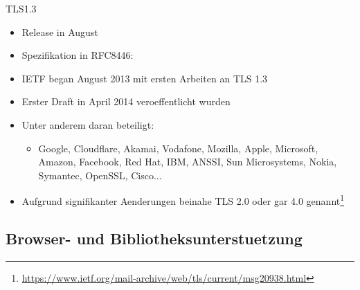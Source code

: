 \documentclass{f4_beamer_metropolis}
\begin{document}
\begin{frame}{TLS1.3}
  \begin{itemize}
    \item Release in August \citeyear{RFC8446}
    \item Spezifikation in RFC8446: \textit{}
    \item IETF began August 2013 mit ersten Arbeiten an TLS 1.3
    \item Erster Draft in April 2014 veroeffentlicht wurden
    \item Unter anderem daran beteiligt:
    \begin{itemize}
      \item Google, Cloudflare, Akamai, Vodafone, Mozilla, Apple, Microsoft, Amazon, Facebook, Red Hat, IBM, ANSSI, Sun Microsystems, Nokia, Symantec, OpenSSL, Cisco...
    \end{itemize}
    \item Aufgrund signifikanter Aenderungen beinahe TLS 2.0 oder gar 4.0 genannt\footnote{\url{https://www.ietf.org/mail-archive/web/tls/current/msg20938.html}}
  \end{itemize}

\end{frame}


\subsection{Browser- und Bibliotheksunterstuetzung}
\end{document}
